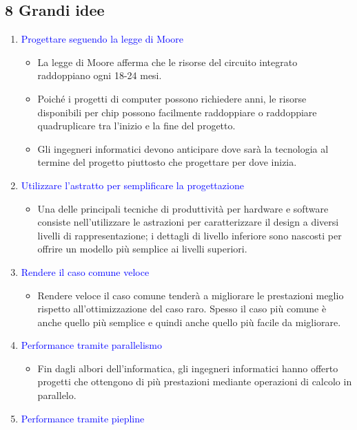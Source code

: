 \documentclass[12pt,a4paper]{article}
\begin{document}
\subsection{8 Grandi idee}
\begin{enumerate}
\item \textcolor{blue}{Progettare seguendo la legge di Moore}
\begin{itemize}
\item La legge di Moore afferma che le risorse del circuito integrato raddoppiano ogni 18-24 mesi.
\item Poiché i progetti di computer possono richiedere anni, le risorse disponibili per chip possono facilmente raddoppiare o raddoppiare quadruplicare tra l'inizio e la fine del progetto.
\item Gli ingegneri informatici devono anticipare dove sarà la tecnologia al termine del progetto piuttosto che progettare per dove inizia.
\end{itemize}
\clearpage
\item \textcolor{blue}{Utilizzare l'astratto per semplificare la progettazione}
\begin{itemize}
\item Una delle principali tecniche di produttività per hardware e software consiste nell'utilizzare le astrazioni per caratterizzare
il design a diversi livelli di rappresentazione; i dettagli di livello inferiore sono nascosti per offrire un modello più semplice ai livelli superiori.
\end{itemize}
\item \textcolor{blue}{Rendere il caso comune veloce}
\begin{itemize}
\item Rendere veloce il caso comune tenderà a migliorare le prestazioni meglio rispetto all'ottimizzazione del caso raro. Spesso il caso più comune è anche quello più semplice e quindi anche quello più facile da migliorare.
\end{itemize}
\item \textcolor{blue}{Performance tramite parallelismo}
\begin{itemize}
\item Fin dagli albori dell'informatica, gli ingegneri informatici hanno offerto progetti che ottengono di più prestazioni mediante operazioni di calcolo in parallelo.
\end{itemize}
\item \textcolor{blue}{Performance tramite piepline}
\begin{itemize}

\end{itemize}
\end{enumerate}
\end{document}
